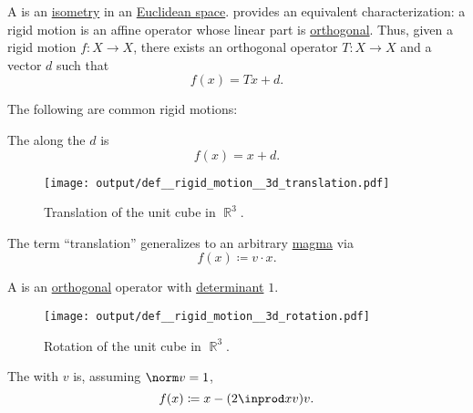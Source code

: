 \begin{definition}\label{def:rigid_motion}\mimprovised
  A  is an \hyperref[def:isometry]{isometry} in an \hyperref[def:euclidean_space]{Euclidean space}.  provides an equivalent characterization: a rigid motion is an affine operator whose linear part is \hyperref[def:unitary_operator]{orthogonal}. Thus, given a rigid motion \( f: X \to X \), there exists an orthogonal operator \( T: X \to X \) and a vector \( d \) such that
  \begin{equation*}
    f(x) = Tx + d.
  \end{equation*}

  The following are common rigid motions:
  \begin{thmenum}
     The  along the  \( d \) is
    \begin{equation*}
      f(x) = x + d.
    \end{equation*}

    \begin{figure}[!ht]
      \centering
      \texttt{[image: output/def\_\_rigid\_motion\_\_3d\_translation.pdf]}
      \caption{Translation of the unit cube in \( \BbbR^3 \).}\label{fig:def/rigid_motion/3d_translation}
    \end{figure}

    The term \enquote{translation} generalizes to an arbitrary \hyperref[def:magma]{magma} via
    \begin{equation*}
      f(x) \coloneqq v \cdot x.
    \end{equation*}

     A  is an \hyperref[def:orthogonal_operator]{orthogonal} operator with \hyperref[def:matrix_determinant]{determinant} \( 1 \).

    \begin{figure}[!ht]
      \centering
      \texttt{[image: output/def\_\_rigid\_motion\_\_3d\_rotation.pdf]}
      \caption{Rotation of the unit cube in \( \BbbR^3 \).}\label{fig:def/rigid_motion/3d_rotation}
    \end{figure}

     The  with  \( v \) is, assuming \( \norm v = 1 \),
    \begin{equation*}
      f(x) \coloneqq x - (2 \inprod x v) v.
    \end{equation*}


\end{thmenum}
\end{definition}
